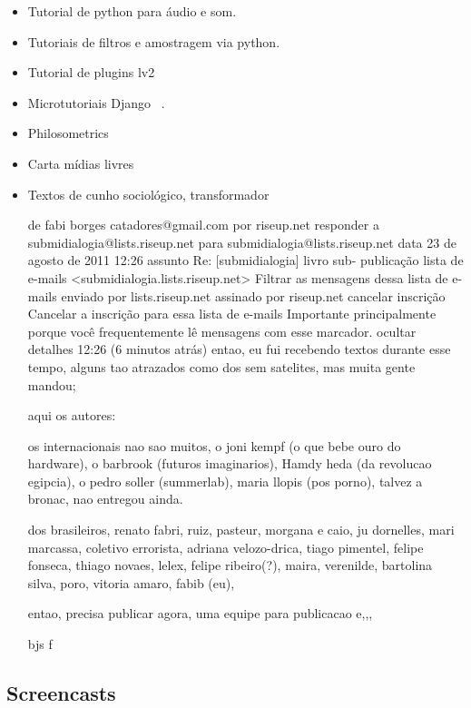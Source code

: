 \begin{itemize}
    \item Tutorial de python para áudio e som.

    \item Tutoriais de filtros e amostragem via python.

    \item Tutorial de plugins lv2

    \item Microtutoriais Django ~\cite{dmicrotuts}.

    \item Philosometrics

    \item Carta mídias livres

    \item Textos de cunho sociológico, transformador

de      fabi borges catadores@gmail.com por  riseup.net 
responder a     submidialogia@lists.riseup.net
para    submidialogia@lists.riseup.net
data    23 de agosto de 2011 12:26
assunto Re: [submidialogia] livro sub- publicação
lista de e-mails        <submidialogia.lists.riseup.net> Filtrar as mensagens dessa lista de e-mails
enviado por     lists.riseup.net
assinado por    riseup.net
cancelar inscrição      Cancelar a inscrição para essa lista de e-mails
        Importante principalmente porque você frequentemente lê mensagens com esse marcador.
ocultar detalhes 12:26 (6 minutos atrás)
entao, eu fui recebendo textos durante esse tempo,
alguns tao atrazados como dos sem satelites, mas muita gente mandou;

aqui os autores:

os internacionais nao sao muitos, o joni kempf (o que bebe ouro do hardware), o barbrook (futuros imaginarios),
Hamdy heda (da revolucao egipcia), o pedro soller (summerlab), maria llopis (pos porno),  talvez a bronac, nao entregou ainda.

dos brasileiros, renato fabri, ruiz, pasteur, morgana e caio, ju dornelles, mari marcassa, coletivo errorista, adriana velozo-drica, tiago pimentel, felipe fonseca, thiago novaes, lelex, felipe ribeiro(?), maira, verenilde,  bartolina silva, poro, vitoria amaro, fabib (eu),

entao, precisa publicar agora,
uma equipe para publicacao e,,, 

bjs
f


\end{itemize}

\subsection{Screencasts}

